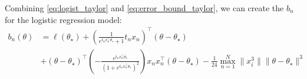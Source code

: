 Combining \eqref{eq:logist_taylor} and \eqref{eq:error_bound_taylor}, we can create the $b_n$ for the logistic regression model: 
\begin{equation*}
\begin{split}
    b_n\left(\theta\right) &= \ell\left(\theta_{\star}\right) + \left(\frac{1}{e^{t_n x_n^{\top}\theta_{\star} } + 1} t_n x_n\right)^{\top}
    \left(\theta - \theta_{\star} \right) \\ 
    &+ \left(\theta - \theta_{\star}\right)^{\top}
    \left(-\frac{e^{t_n x_n^{\top}\theta_{\star} }}{\left(1 + e^{t_n x_n^{\top}\theta_{\star} }\right)^2}\right)x_n x_n^{\top} \left(\theta - \theta_{\star}\right) - \frac{1}{24} \max_{n=1}^N \lVert x_i^3\rVert \lVert\theta-\theta_{\star}\rVert^3
    \end{split}
\end{equation*}

